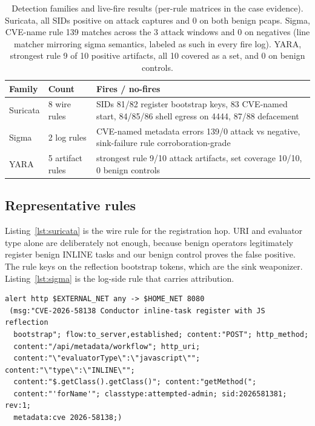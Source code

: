 \documentclass[journal]{IEEEtran}
\begin{document}
\begin{table}[t]
\centering
\caption{Detection families and live-fire results (per-rule matrices in the
case evidence). Suricata, all SIDs positive on attack captures and 0 on both
benign pcaps. Sigma, CVE-name rule 139 matches across the 3 attack windows
and 0 on negatives (line matcher mirroring sigma semantics, labeled as such
in every fire log). YARA, strongest rule 9 of 10 positive artifacts, all 10
covered as a set, and 0 on benign
controls.}
\label{tab:detect}
\footnotesize
\begin{tabular}{@{}p{1.7cm}p{1.55cm}p{4.3cm}@{}}
\toprule
Family & Count & Fires / no-fires \\
\midrule
Suricata & 8 wire rules & SIDs 81/82 register bootstrap keys, 83 CVE-named
start, 84/85/86 shell egress on 4444, 87/88 defacement \\
Sigma & 2 log rules & CVE-named metadata errors 139/0 attack vs negative,
sink-failure rule corroboration-grade \\
YARA & 5 artifact rules & strongest rule 9/10 attack artifacts, set coverage
10/10, 0 benign controls \\
\bottomrule
\end{tabular}
\end{table}

\subsection{Representative rules}

Listing~\ref{lst:suricata} is the wire rule for the registration hop. URI and
evaluator type alone are deliberately not enough, because benign operators
legitimately register benign INLINE tasks and our benign control proves the
false positive. The rule keys on the reflection bootstrap tokens, which are
the sink weaponizer. Listing~\ref{lst:sigma} is the log-side rule that carries
attribution.

\begin{lstlisting}[style=yargen,caption={Suricata SID 2026581381 (verbatim,
long content tokens wrapped by the listing style).},label={lst:suricata}]
alert http $EXTERNAL_NET any -> $HOME_NET 8080
 (msg:"CVE-2026-58138 Conductor inline-task register with JS reflection
  bootstrap"; flow:to_server,established; content:"POST"; http_method;
  content:"/api/metadata/workflow"; http_uri;
  content:"\"evaluatorType\":\"javascript\""; content:"\"type\":\"INLINE\"";
  content:"$.getClass().getClass()"; content:"getMethod(";
  content:"'forName'"; classtype:attempted-admin; sid:2026581381; rev:1;
  metadata:cve 2026-58138;)
\end{lstlisting}
\end{document}
